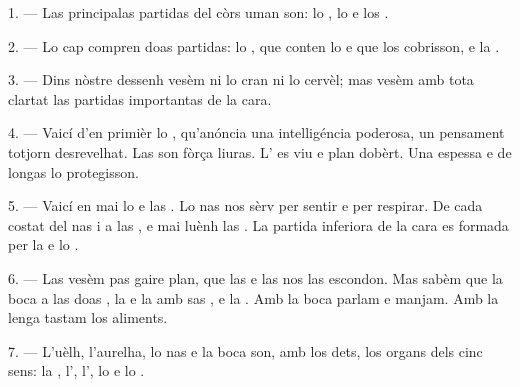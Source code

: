 
\VUsaut{4.0mm}
\VUsaut{2.0mm}

\VUsaut{2.4mm}
\VUsaut{3.0mm}

\VUsaut{3.0mm}

1. --- Las principalas partidas del còrs uman son: lo , lo
 e los .

2. --- Lo cap compren doas partidas: lo , que conten lo
 e que los  cobrisson, e la .

3. --- Dins nòstre dessenh vesèm ni lo cran ni lo cervèl; mas vesèm amb tota
clartat las partidas importantas de la cara.

4. --- Vaicí d'en primièr lo , qu'anóncia una intelligéncia
poderosa, un pensament totjorn desrevelhat. Las  son fòrça
liuras. L' es viu e plan dobèrt. Una  espessa e de
 longas lo protegisson.

5. --- Vaicí en mai lo  e las . Lo nas nos sèrv per
sentir e per respirar. De cada costat del nas i a las , e mai luènh
las . La partida inferiora de la cara es formada per la
 e lo .

6. --- Las vesèm pas gaire plan, que las  e las 
nos las escondon. Mas sabèm que la boca a las doas , la
 e la  amb sas ,
e la . Amb la boca parlam e manjam. Amb la lenga tastam los
aliments.

7. --- L'uèlh, l'aurelha, lo nas e la boca son, amb los dets, los organs dels
cinc sens: la , l', l', lo
 e lo .

